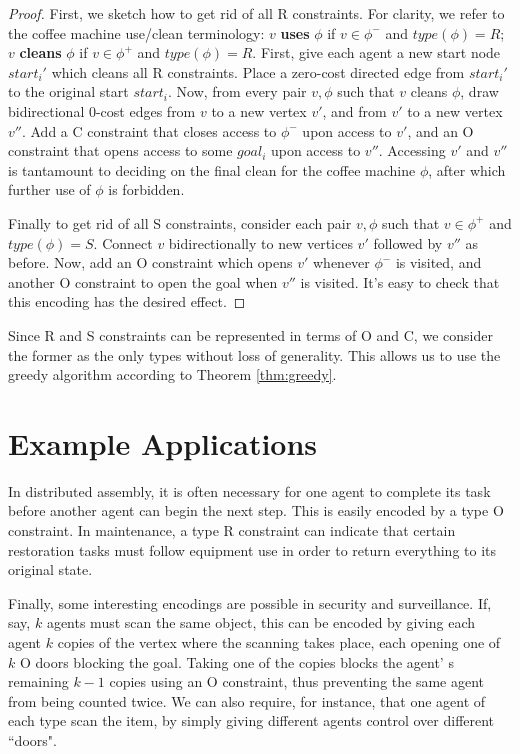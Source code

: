 \documentclass[letterpaper]{article}
\begin{document}
\begin{proof}
First, we sketch how to get rid of all R constraints. For clarity, we refer to the coffee machine use/clean terminology: $v$ \textbf{uses} $\phi$ if $v\in\phi^-$ and $type(\phi) = R$; $v$ \textbf{cleans} $\phi$ if $v\in\phi^+$ and $type(\phi) = R$. First, give each agent a new start node $start_i'$ which cleans all R constraints. Place a zero-cost directed edge from $start_i'$ to the original start $start_i$. Now, from every pair $v,\phi$ such that $v$ cleans $\phi$, draw bidirectional 0-cost edges from $v$ to a new vertex $v'$, and from $v'$ to a new vertex $v''$. Add a C constraint that closes access to $\phi^-$ upon access to $v'$, and an O constraint that opens access to some $goal_i$ upon access to $v''$. Accessing $v'$ and $v''$ is tantamount to deciding on the final clean for the coffee machine $\phi$, after which further use of $\phi$ is forbidden.

Finally to get rid of all S constraints, consider each pair $v,\phi$ such that $v\in\phi^+$ and $type(\phi) = S$. Connect $v$ bidirectionally to new vertices $v'$ followed by $v''$ as before. Now, add an O constraint which opens $v'$ whenever $\phi^-$ is visited, and another O constraint to open the goal when $v''$ is visited. It's easy to check that this encoding has the desired effect.
\end{proof}

Since R and S constraints can be represented in terms of O and C, we consider the former as the only types without loss of generality. This allows us to use the greedy algorithm according to Theorem \ref{thm:greedy}.

\section{Example Applications}

In distributed assembly, it is often necessary for one agent to complete its task before another agent can begin the next step. This is easily encoded by a type O constraint. In maintenance, a type R constraint can indicate that certain restoration tasks must follow equipment use in order to return everything to its original state.

Finally, some interesting encodings are possible in security and surveillance. If, say, $k$ agents must scan the same object, this can be encoded by giving each agent $k$ copies of the vertex where the scanning takes place, each opening one of $k$ O doors blocking the goal. Taking one of the copies blocks the agent' s remaining $k-1$ copies using an O constraint, thus preventing the same agent from being counted twice. We can also require, for instance, that one agent of each type scan the item, by simply giving different agents control over different ``doors".
\end{document}

